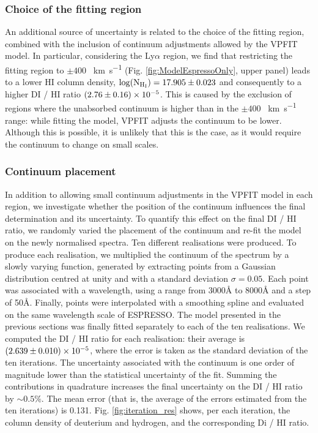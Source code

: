 \documentclass[fleqn,usenatbib]{mnras}
\makeatletter
\DeclareRobustCommand{\ion}[2]{%
  \mbox{#1\check@mathfonts\fontsize\sf@size\z@\selectfont #2}%
}
\DeclareRobustCommand{\kms}[1]{\SI{#1}{\km\per\second}}
\makeatother
\begin{document}
\subsubsection{Choice of the fitting region}
\label{sec:fittingRegion}
An additional source of uncertainty is related to the choice of the fitting region, combined with the inclusion of continuum adjustments allowed by the VPFIT model. In particular, considering the Ly$\alpha$ region, we find that restricting the fitting region to $\pm400$ \kms{} (Fig. \ref{fig:ModelEspressoOnly}, upper panel) leads to a lower \ion{H}{I} column density, $\log({\rm N_{H_I}})=\num{17.905\pm0.023}$ and consequently to a higher \ion{D}{I}/\ion{H}{I} ratio $\num{2.76\pm0.16e-5}$. This is caused by the exclusion of regions where the unabsorbed continuum is higher than in the $\pm400$ \kms{} range: while fitting the model, VPFIT adjusts the continuum to be lower. Although this is possible, it is unlikely that this is the case, as it would require the continuum to change on small scales.

\subsubsection{Continuum placement} \label{sec:ContinuumPlacement}
In addition to allowing small continuum adjustments in the VPFIT model in each region, we investigate whether the position of the continuum influences the final determination and its uncertainty. To quantify this effect on the final \ion{D}{I}/\ion{H}{I} ratio, we randomly varied the placement of the continuum and re-fit the model on the newly normalised spectra. Ten different realisations were produced. 
To produce each realisation, we multiplied the continuum of the spectrum by a slowly varying function, generated by extracting points from a Gaussian distribution centred at unity and with a standard deviation $\sigma=0.05$. Each point was associated with a wavelength, using a range from 3000\AA{} to 8000\AA{} and a step of 50\AA. Finally, points were interpolated with a smoothing spline and evaluated on the same wavelength scale of ESPRESSO.
The model presented in the previous sections was finally fitted separately to each of the ten realisations. We computed the \ion{D}{I}/\ion{H}{I} ratio for each realisation: their average is $\num{2.639\pm0.010e-5}$, where the error is taken as the standard deviation of the ten iterations. The uncertainty associated with the continuum is one order of magnitude lower than the statistical uncertainty of the fit. Summing the contributions in quadrature increases the final uncertainty on the \ion{D}{I}/\ion{H}{I} ratio by $\sim 0.5 \%$. The mean error (that is, the average of the errors estimated from the ten iterations) is 0.131. Fig. \ref{fig:iteration_res} shows, per each iteration, the column density of deuterium and hydrogen, and the corresponding \ion{D}{i}/\ion{H}{I} ratio.
\end{document}
